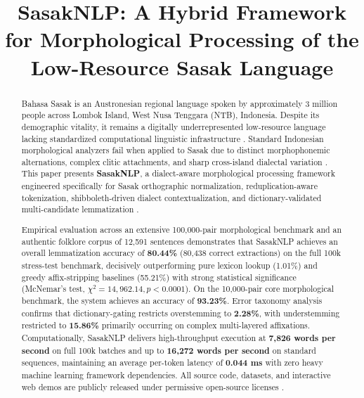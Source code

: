 \documentclass[journal,10pt]{IEEEtran}
\begin{document}
\title{SasakNLP: A Hybrid Framework for Morphological Processing of the Low-Resource Sasak Language}

\author{
}

\maketitle

\begin{abstract}
Bahasa Sasak is an Austronesian regional language spoken by approximately 3 million people across Lombok Island, West Nusa Tenggara (NTB), Indonesia. Despite its demographic vitality, it remains a digitally underrepresented low-resource language lacking standardized computational linguistic infrastructure \cite{aji2022, winata2023}. Standard Indonesian morphological analyzers fail when applied to Sasak due to distinct morphophonemic alternations, complex clitic attachments, and sharp cross-island dialectal variation \cite{hakim2023, yaqin2022, abidin2024}. This paper presents \textbf{SasakNLP}, a dialect-aware morphological processing framework engineered specifically for Sasak orthographic normalization, reduplication-aware tokenization, shibboleth-driven dialect contextualization, and dictionary-validated multi-candidate lemmatization \cite{balaibahasa2022, sasaknlp2026, jurafsky2024}.

Empirical evaluation across an extensive 100,000-pair morphological benchmark and an authentic folklore corpus of 12,591 sentences demonstrates that SasakNLP achieves an overall lemmatization accuracy of \textbf{80.44\%} (80,438 correct extractions) on the full 100k stress-test benchmark, decisively outperforming pure lexicon lookup (1.01\%) and greedy affix-stripping baselines (55.21\%) with strong statistical significance (McNemar's test, $\chi^2 = 14,962.14, p < 0.0001$). On the 10,000-pair core morphological benchmark, the system achieves an accuracy of \textbf{93.23\%}. Error taxonomy analysis confirms that dictionary-gating restricts overstemming to \textbf{2.28\%}, with understemming restricted to \textbf{15.86\%} primarily occurring on complex multi-layered affixations. Computationally, SasakNLP delivers high-throughput execution at \textbf{7,826 words per second} on full 100k batches and up to \textbf{16,272 words per second} on standard sequences, maintaining an average per-token latency of \textbf{0.044 ms} with zero heavy machine learning framework dependencies. All source code, datasets, and interactive web demos are publicly released under permissive open-source licenses \cite{sasaknlp2026}.
\end{abstract}
\end{document}
